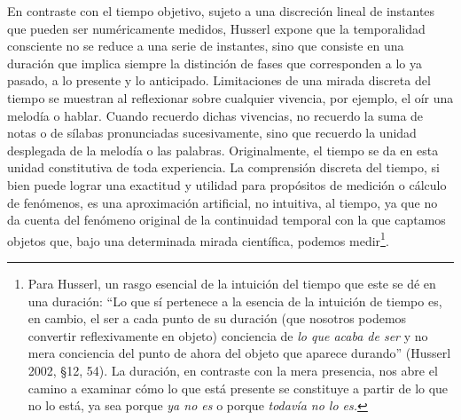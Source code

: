 En contraste con el tiempo objetivo, sujeto a una discreción lineal de
instantes que pueden ser numéricamente medidos, Husserl expone que la
temporalidad consciente no se reduce a una serie de instantes, sino que
consiste en una duración que implica siempre la distinción de fases que
corresponden a lo ya pasado, a lo presente y lo anticipado. Limitaciones
de una mirada discreta del tiempo se muestran al reflexionar sobre
cualquier vivencia, por ejemplo, el oír una melodía o hablar. Cuando
recuerdo dichas vivencias, no recuerdo la suma de notas o de sílabas
pronunciadas sucesivamente, sino que recuerdo la unidad desplegada de la
melodía o las palabras. Originalmente, el tiempo se da en esta unidad
constitutiva de toda experiencia. La comprensión discreta del tiempo, si
bien puede lograr una exactitud y utilidad para propósitos de medición o
cálculo de fenómenos, es una aproximación artificial, no intuitiva, al
tiempo, ya que no da cuenta del fenómeno original de la continuidad
temporal con la que captamos objetos que, bajo una determinada mirada
científica, podemos medir\footnote{Para Husserl, un rasgo esencial de la
  intuición del tiempo que este se dé en una duración: ``Lo que sí
  pertenece a la esencia de la intuición de tiempo es, en cambio, el ser
  a cada punto de su duración (que nosotros podemos convertir
  reflexivamente en objeto) conciencia de \emph{lo que acaba de ser} y
  no mera conciencia del punto de ahora del objeto que aparece durando''
  (Husserl 2002, §12, 54). La duración, en contraste con la mera
  presencia, nos abre el camino a examinar cómo lo que está presente se
  constituye a partir de lo que no lo está, ya sea porque \emph{ya no
  es} o porque \emph{todavía no lo es.}}.

